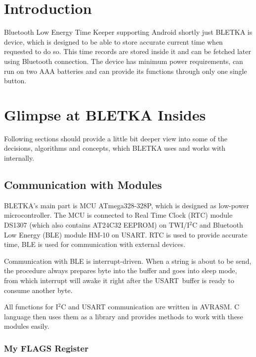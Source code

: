\documentclass[22pt,oneside,a4paper]{article}
\newcommand{\twi}{I$^2$C }
\begin{document}


\tableofcontents
\newpage


\section*{Introduction}
Bluetooth Low Energy Time Keeper supporting Android shortly just BLETKA is device, which is designed to be able to store accurate current time when requested to do so. This time records are stored inside it and can be fetched later using Bluetooth connection. The device has minimum power requirements, can run on two AAA batteries and can provide its functions through only one single button.


\section{Glimpse at BLETKA Insides}

Following sections should provide a little bit deeper view into some of the decisions, algorithms and concepts, which BLETKA uses and works with internally.


\subsection{Communication with Modules}
BLETKA's main part is MCU ATmega328-328P, which is designed as low-power microcontroller. The MCU is connected to Real Time Clock (RTC) module DS1307 (which also contains AT24C32 EEPROM) on TWI/\twi and Bluetooth Low Energy (BLE) module HM-10 on USART. RTC is used to provide accurate time, BLE is used for communication with external devices.

Communication with BLE is interrupt-driven. When a string is about to be send, the procedure always prepares byte into the buffer and goes into sleep mode, from which interrupt will awake it right after the USART buffer is ready to consume another byte.

All functions for \twi and USART communication are written in AVRASM. C language then uses them as a library and provides methods to work with these modules easily.


\subsubsection{My FLAGS Register}
\label{sec:mflags}
\end{document}
